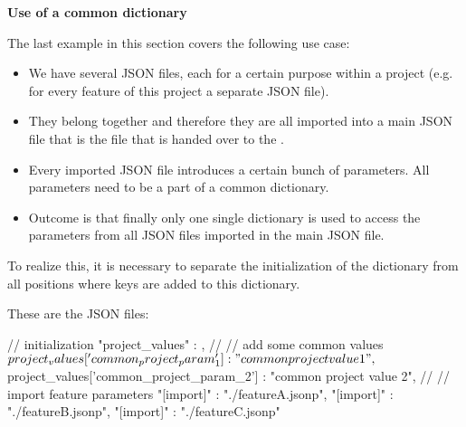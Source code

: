 \vspace{2ex}

\textbf{Use of a common dictionary}

\vspace{2ex}

The last example in this section covers the following use case:

\begin{itemize}
   \item We have several JSON files, each for a certain purpose within a project (e.g. for every feature of this project a separate JSON file).
   \item They belong together and therefore they are all imported into a main JSON file that is the file that is handed over to the \pkg.
   \item Every imported JSON file introduces a certain bunch of parameters. All parameters need to be a part of a common dictionary.
   \item Outcome is that finally only one single dictionary is used to access the parameters from all JSON files imported in the main JSON file.
\end{itemize}

To realize this, it is necessary to separate the initialization of the dictionary from all positions where keys are added to this dictionary.

These are the JSON files:

\vspace{2ex}

\textbullet {}

\begin{pythoncode}
{
   // initialization
   "project_values" : {},
   //
   // add some common values
   ${project_values}['common_project_param_1'] : "common project value 1",
   ${project_values}['common_project_param_2'] : "common project value 2",
   //
   // import feature parameters
   "[import]" : "./featureA.jsonp",
   "[import]" : "./featureB.jsonp",
   "[import]" : "./featureC.jsonp"
}
\end{pythoncode}

\newpage

\textbullet {}


